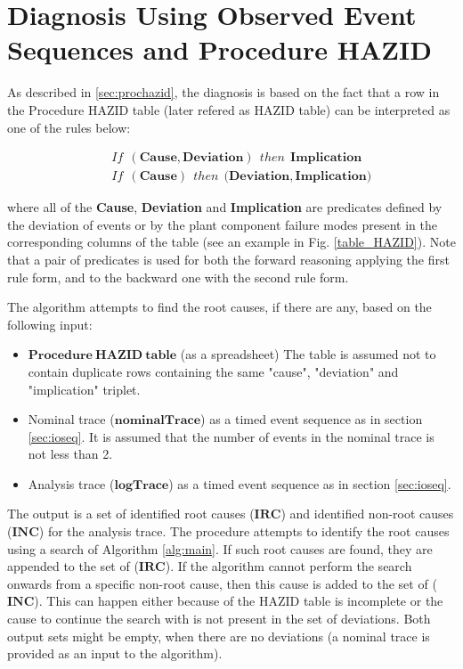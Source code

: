 \documentclass[conference]{IEEEtran}
\begin{document}
%
\section{Diagnosis Using Observed Event Sequences and Procedure HAZID}
\label{sec:reasoning}

As described in \ref{sec:prochazid}, the diagnosis is based on the fact that a row in the Procedure HAZID 
table (later refered as HAZID table) can be interpreted as one of the rules below:
\begin{small}
\begin{eqnarray*}
&& If~~\mathbf{(Cause,Deviation)}~~then~~\mathbf{Implication} \\
&& If~~\mathbf{(Cause)}~~then~~\mathbf{(Deviation,Implication})
\end{eqnarray*}
\end{small}
\noindent where all of the \textbf{Cause}, \textbf{Deviation} and \textbf{Implication}
 are predicates
 defined by the deviation of events or by the plant component failure modes
present in the corresponding columns of the table (see an example in Fig. \ref{table_HAZID}).
Note that a pair of predicates is used for both the forward reasoning
 applying the first rule form, and to the backward one with the second rule form.

 
The algorithm attempts to find the root causes, if there are any, based on the following input:
\begin{itemize}
	\item $\mathbf{Procedure~HAZID~table}$ (as a spreadsheet) The table is assumed not to contain duplicate rows containing the same "cause", "deviation" and "implication" triplet.
	\item Nominal trace ($\mathbf{nominalTrace}$) as a timed event sequence as in section \ref{sec:ioseq}. It is assumed that the number of events in the nominal trace is not less than 2.
	\item Analysis trace ($\mathbf{logTrace}$) as a timed event sequence as in section \ref{sec:ioseq}.
\end{itemize}

The output is a set of identified root causes ($\mathbf{IRC}$) and identified non-root causes ($\mathbf{INC}$) for the analysis trace. The procedure attempts to identify the root causes using a search of Algorithm \ref{alg:main}. If such root causes are found, they are appended to the set of ($\mathbf{IRC}$). If the algorithm cannot perform the search onwards from a specific non-root cause, then this cause is added to the set of ($\mathbf{INC}$). This can happen either because of the HAZID table is incomplete or the cause to continue the search with is not present in the set of deviations. Both output sets might be empty, when there are no deviations (a nominal trace is provided as an input to the algorithm).
\end{document}
